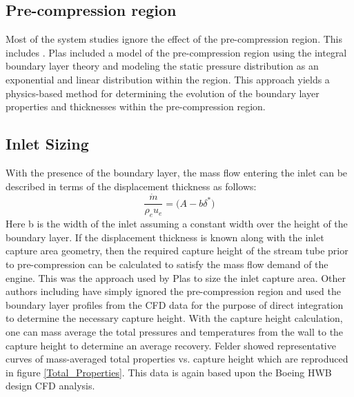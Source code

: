 \documentclass[12pt]{gatech-thesis}
\begin{document}
\subsection{Pre-compression region}
\indent Most of the system studies ignore the effect of the pre-compression region.  This includes \cite{Felder2011} \cite{Hardin2012}.  Plas \cite{PlasThesis} included a model of the pre-compression region using the integral boundary layer theory and modeling the static pressure distribution as an exponential and linear distribution within the region.  This approach yields a physics-based method for determining the evolution of the boundary layer properties and thicknesses within the pre-compression region.  

\subsection{Inlet Sizing}
With the presence of the boundary layer, the mass flow entering the inlet can be described in terms of the displacement thickness as follows:
	\begin{equation}\frac{\dot{m}}
			              {\rho_eu_e} = \Big(A - b\delta^*\Big)
           \end{equation}%
Here b is the width of the inlet assuming a constant width over the height of the boundary layer.  If the displacement thickness is known along with the inlet capture area geometry, then the required capture height of the stream tube prior to pre-compression can be calculated to satisfy the mass flow demand of the engine.  This was the approach used by Plas \cite{PlasThesis} to size the inlet capture area.  Other authors including \cite{Felder2012} have simply ignored the pre-compression region and used the boundary layer profiles from the CFD data for the purpose of direct integration to determine the necessary capture height.
\indent With the capture height calculation, one can mass average the total pressures and temperatures from the wall to the capture height to determine an average recovery.  Felder showed representative curves of mass-averaged total properties vs. capture height which are reproduced in figure \ref{Total_Properties}.  This data is again based upon the Boeing HWB design CFD analysis.
\end{document}
